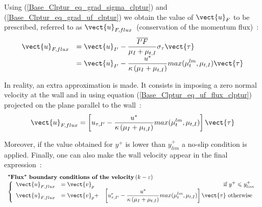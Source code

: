 Using (\ref{Base_Clptur_eq_grad_sigma_clptur}) and
(\ref{Base_Clptur_eq_grad_uf_clptur}) we obtain the value of $\vect{u}_F$
to be prescribed, referred to as $\vect{u}_{F,flux}$~(conservation of the momentum flux)~:
\begin{equation}\label{Base_Clptur_eq_uf_flux_clptur}
\begin{array}{ll}
\vect{u}_{F,flux}&=\vect{u}_{I'}-\displaystyle\frac{\overline{I'F}}{\mu_I+\mu_{t,I}}\sigma_\tau \vect{\tau}\\
                 &=\vect{u}_{I'}-\displaystyle\frac{u^*}{\kappa\, (\mu_I+\mu_{t,I})} max(\mu_{t}^{lm},\mu_{t,I}) \vect{\tau}
\end{array}
\end{equation}

In reality, an extra approximation is made. It consists in imposing a zero
 normal velocity at the wall and in using equation (\ref{Base_Clptur_eq_uf_flux_clptur})
 projected on the plane parallel to the wall~:
\begin{equation}
\vect{u}_{F,flux}=\left[u_{\tau,I'}-\displaystyle\frac{u^*}{\kappa\,
(\mu_I+\mu_{t,I})} max(\mu_{t}^{lm},\mu_{t,I}) \right]\vect{\tau}
\end{equation}

Moreover, if the value obtained for $y^+$ is
lower than  $y^+_{lim}$ a no-slip condition is applied.
Finally, one can also make the wall velocity appear in the final expression~:
\begin{equation}
\begin{array}{l}
\text{\bf "Flux" boundary conditions of the velocity}\,(k-\varepsilon)\\
\left\{\begin{array}{llr}
\vect{u}_{F,flux}&=\vect{v}_p& \text{ if\ }  y^+\leqslant
                           y^+_{lim} \\
\vect{u}_{F,flux}&=\vect{v}_p+&\left[u^r_{\tau,I'}-\displaystyle\frac{u^*}{\kappa\,
(\mu_I+\mu_{t,I})} max(\mu_{t}^{lm},\mu_{t,I}) \right]\vect{\tau}
\text{ otherwise }
\end{array}\right.
\end{array}
\end{equation}


